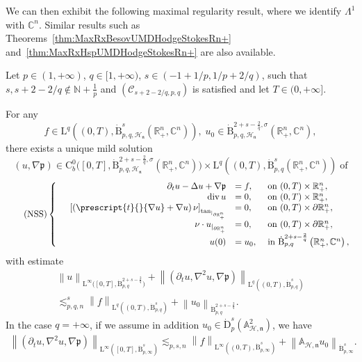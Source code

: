 \documentclass[AHL,Unicode,longabstracts,published]{cedram}
\renewcommand*{\div}{\mathrm{div\,}}
\newcommand{\bbA}{\mathbb{A}}
\newcommand{\bbR}{\mathbb{R}}
\newcommand{\bbC}{\mathbb{C}}
\newcommand{\bbN}{\mathbb{N}}
\newcommand{\rmB}{\mathrm{B}}
\newcommand{\rmD}{\mathrm{D}}
\newcommand{\rmL}{\mathrm{L}}
\newcommand{\rmC}{\mathrm{C}}
\newcommand{\rtan}{\mathrm{tan}}
\newcommand{\clH}{\mathcal{H}}
\newcommand{\clC}{\mathcal{C}}
\newcommand{\fkn}{\mathfrak{n}}
\begin{document}
We can then exhibit the following maximal regularity result, where we identify $\Lambda^1$ with $\bbC^n$. Similar results such as Theorems~\ref{thm:MaxRxBesovUMDHodgeStokesRn+} and~\ref{thm:MaxRxHspUMDHodgeStokesRn+} are also available.

\begin{theo}\label{thm:MaxRxBesovNavierSlipStokesRn+}
Let $p\in(1,+\infty)$, $q\in[1,+\infty)$, $s\in(-1+1/p,1/p+2/q)$, such that $s,s+2-2/q\notin \bbN +\frac{1}{p}$ and $(\clC_{s+2-2/q,p,q})$ is satisfied and let $T\in(0,+\infty]$.

For any 
\[
f\in \rmL^q\left((0,T),\dot{\rmB}^{s}_{p,q,\mathcal{\clH_{\fkn}}}\left(\bbR^n_+,\bbC^n\right)\right),\; u_0\in \dot{\rmB}^{2+s-\frac{2}{q},\sigma}_{p,q,\clH_\fkn}\left(\bbR^n_+,\bbC^n\right),
\]
there exists a unique mild solution 
\[
\left(u,\nabla \mathfrak{p}\right) \in \rmC ^0_b\big([0,T],\dot{\rmB}^{2+s-\frac{2}{q},\sigma}_{p,q,\clH_\fkn}\left(\bbR^n_+,\bbC^n\right)\big)\times \rmL^q\left((0,T),\dot{\rmB}^{s}_{p,q}\left(\bbR^n_+,\bbC^n\right)\right) \;\text{of}
\]
\begin{equation}\label{eq:StokesNavierSlipBCSystem}
\tag{NSS}
\left\{
\begin{array}{rrll}
&{\partial_t u - \Delta u+\nabla \mathfrak{p}}  &{= f,} &{\text{ on } (0,T)\times\bbR^n_+,}\\
&{\div u} &{=  0,} &{\text{ on } (0,T)\times\bbR^n_+,}\\
&{\left[ \left(\prescript{t}{}{{\nabla u}} + \nabla u\right)\nu \right]_{{\rtan}_{|_{\partial\bbR^n_+}}}} &{= 0,}
&{\text{ on } (0,T)\times\partial\bbR^n_+,}\\
&{\nu \cdot u_{|_{\partial\bbR^n_+}}} &{=  0,}
&{\text{ on } (0,T)\times\partial\bbR^n_+,}\\
&{u(0)} &{=  u_0,} &{\text{ in } \dot{\rmB}^{2+s-\frac{2}{q}}_{p,q}\left(\bbR^n_+,\bbC^n\right),}
\end{array}\right.
\end{equation}
with estimate
\begin{multline*}
\left\| u \right\|_{\rmL^\infty\big([0,T],\dot{\rmB}^{2+s-\frac{2}{q}}_{p,q}\big)} + 
\left\| \left(\partial_t u, \nabla^2 u,\nabla \mathfrak{p}\right) \right\|_{\rmL^q\left((0,T),\dot{\rmB}^{s}_{p,q}\right)}\\
\lesssim_{p,q,n}^{s} \left\| f \right\|_{\rmL^q\left((0,T),\dot{\rmB}^{s}_{p,q}\right)} + \left\| u_0 \right\|_{\dot{\rmB}^{2+s-\frac{2}{q}}_{p,q}}.
\end{multline*}
In the case $q=+\infty$, if we assume in addition $u_0\in \dot{\rmD}^{s}_{p}(\bbA_{\clH,\fkn}^2)$, we have
\begin{align*}
\left\| \left(\partial_t u, \nabla^2 u,\nabla \mathfrak{p}\right) \right\|_{\rmL^\infty\left([0,T],\dot{\rmB}^{s}_{p,\infty}\right)} \lesssim_{p,s,n} \left\| f \right\|_{\rmL^\infty\left((0,T),\dot{\rmB}^{s}_{p,\infty}\right)} + \left\| \bbA_{\clH,\fkn} u_0 \right\|_{\dot{\rmB}^{s}_{p,\infty}}.
\end{align*}
\end{theo}
\end{document}
